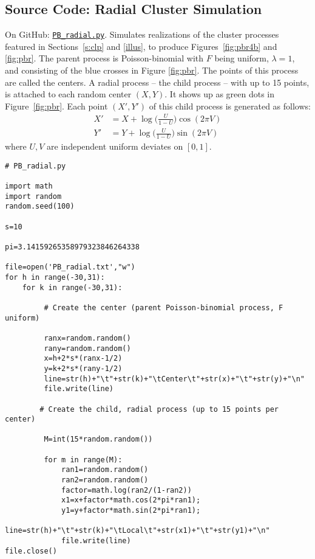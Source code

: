 \documentclass[10pt]{article}
\begin{document}
\subsection{Source Code: Radial Cluster Simulation}\label{s:code2}

{On GitHub}: \href{https://github.com/VincentGranville/Point-Processes/blob/main/Source\%20Code/PB_radial.py}{\texttt{PB\_radial.py}}. Simulates realizations of the cluster processes featured in Sections~\ref{s:clp} and \ref{illus}, to produce 
Figures~\ref{fig:pbr4b} and \ref{fig:pbr}. The \textcolor{index}{parent process} is Poisson-binomial with $F$ being uniform, $\lambda=1$, and consisting of the blue crosses in Figure \ref{fig:pbr}. The points of this process are called the centers. A radial process -- the \textcolor{index}{child process} -- with up to 15 points, is attached to each random center $(X, Y)$. It shows up as green dots in Figure~\ref{fig:pbr}. 
Each  point $(X', Y')$ of this child process is generated as follows:
\begin{align}
X' & = X + \log\Big(\frac{U}{1-U}\Big) \cos(2\pi V)\nonumber\\
Y' & = Y + \log\Big(\frac{U}{1-U}\Big) \sin(2\pi V)\nonumber
\end{align}
where $U,V$ are independent uniform deviates on $[0,1]$. 

\begin{lstlisting}
# PB_radial.py 

import math
import random
random.seed(100)

s=10

pi=3.14159265358979323846264338

file=open('PB_radial.txt',"w")
for h in range(-30,31): 
    for k in range(-30,31): 

         # Create the center (parent Poisson-binomial process, F uniform)

         ranx=random.random()
         rany=random.random()
         x=h+2*s*(ranx-1/2)
         y=k+2*s*(rany-1/2)
         line=str(h)+"\t"+str(k)+"\tCenter\t"+str(x)+"\t"+str(y)+"\n"
         file.write(line)

        # Create the child, radial process (up to 15 points per center)

         M=int(15*random.random())

         for m in range(M): 
             ran1=random.random()
             ran2=random.random()
             factor=math.log(ran2/(1-ran2))
             x1=x+factor*math.cos(2*pi*ran1);
             y1=y+factor*math.sin(2*pi*ran1);
             line=str(h)+"\t"+str(k)+"\tLocal\t"+str(x1)+"\t"+str(y1)+"\n"
             file.write(line)
file.close()
\end{lstlisting}
\end{document}
